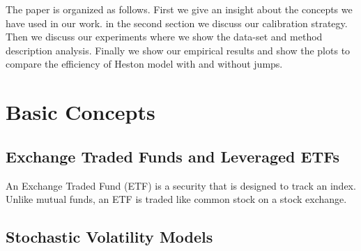 \documentclass{article}
\begin{document}
The paper is organized as follows. First we give an insight about the concepts we have used in our work. in the second section we discuss our calibration strategy. Then we discuss our experiments where we show the data-set and method description analysis. Finally we show our empirical results and show the plots to compare the efficiency of Heston model with and without jumps.

\section{Basic Concepts}
\subsection{Exchange Traded Funds and Leveraged ETFs}
An Exchange Traded Fund (ETF) is a security that is designed to track an index. Unlike mutual funds, an ETF is traded like common stock on a stock exchange. \citep{ref2}

\subsection{Stochastic Volatility Models}
\end{document}
